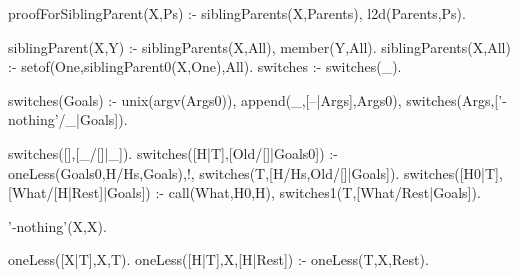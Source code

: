 
proofForSiblingParent(X,Ps) :-
	siblingParents(X,Parents),
	l2d(Parents,Ps).
	
siblingParent(X,Y) :- 
	siblingParents(X,All),
	member(Y,All).
siblingParents(X,All) :- 
	setof(One,siblingParent0(X,One),All).
switches :- switches(_).

switches(Goals) :-
	unix(argv(Args0)),
        append(_,[--|Args],Args0),
	switches(Args,['-nothing'/_|Goals]).
	
switches([],[_/[]|_]).
switches([H|T],[Old/[]|Goals0]) :-
	oneLess(Goals0,H/Hs,Goals),!,
	switches(T,[H/Hs,Old/[]|Goals]).
switches([H0|T],[What/[H|Rest]|Goals]) :-
	call(What,H0,H),
	switches1(T,[What/Rest|Goals]).
	
'-nothing'(X,X).

oneLess([X|T],X,T).
oneLess([H|T],X,[H|Rest]) :- oneLess(T,X,Rest).
